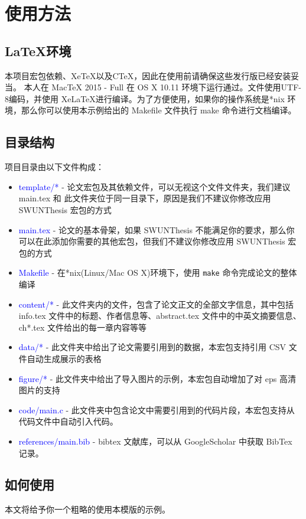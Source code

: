 \chapter{使用方法}
\section{\LaTeX 环境}
本项目宏包依赖\LaTeXe 、Xe\TeX 以及C\TeX ，因此在使用前请确保这些发行版已经安装妥当。
本人在 MacTeX 2015 - Full 在 OS X 10.11 环境下运行通过。文件使用UTF-8编码，并使用 Xe\LaTeX 进行编译。为了方便使用，如果你的操作系统是*nix 环境，那么你可以使用本示例给出的 Makefile 文件执行 make 命令进行文档编译。

\section{目录结构}
项目目录由以下文件构成：
\begin{itemize}
\item \textcolor{blue}{template/*} - 论文宏包及其依赖文件，可以无视这个文件文件夹，我们建议 main.tex 和 此文件夹位于同一目录下，原因是我们不建议你修改应用 SWUNThesis 宏包的方式
\item \textcolor{blue}{main.tex} - 论文的基本骨架，如果 SWUNThesis 不能满足你的要求，那么你可以在此添加你需要的其他宏包，但我们不建议你修改应用 SWUNThesis 宏包的方式
\item \textcolor{blue}{Makefile} - 在*nix(Linux/Mac OS X)环境下，使用 \verb|make| 命令完成论文的整体编译

\item \textcolor{blue}{content/*} - 此文件夹内的文件，包含了论文正文的全部文字信息，其中包括 info.tex 文件中的标题、作者信息等、abstract.tex 文件中的中英文摘要信息、ch*.tex 文件给出的每一章内容等等
\item \textcolor{blue}{data/*} - 此文件夹中给出了论文需要引用到的数据，本宏包支持引用 CSV 文件自动生成展示的表格
\item \textcolor{blue}{figure/*} -  此文件夹中给出了导入图片的示例，本宏包自动增加了对 eps 高清图片的支持
\item \textcolor{blue}{code/main.c} - 此文件夹中包含论文中需要引用到的代码片段，本宏包支持从代码文件中自动引入代码。
\item \textcolor{blue}{references/main.bib} - bibtex 文献库，可以从 GoogleScholar 中获取 BibTex 记录。
\end{itemize}

\section{如何使用}
本文将给予你一个粗略的使用本模版的示例。
